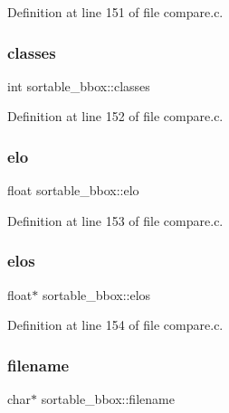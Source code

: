 Definition at line 151 of file compare.\+c.

\mbox{\label{structsortable__bbox_ae063121410175a24bbb9ae8fe901c750}} 
\subsubsection{\texorpdfstring{classes}{classes}}
{\footnotesize\ttfamily int sortable\+\_\+bbox\+::classes}



Definition at line 152 of file compare.\+c.

\mbox{\label{structsortable__bbox_a1e117d8029d714fce1491365316432f5}} 
\subsubsection{\texorpdfstring{elo}{elo}}
{\footnotesize\ttfamily float sortable\+\_\+bbox\+::elo}



Definition at line 153 of file compare.\+c.

\mbox{\label{structsortable__bbox_ab168cd8c3a7c1570cf7da7f7e30ab19c}} 
\subsubsection{\texorpdfstring{elos}{elos}}
{\footnotesize\ttfamily float$\ast$ sortable\+\_\+bbox\+::elos}



Definition at line 154 of file compare.\+c.

\mbox{\label{structsortable__bbox_a2a693ab1fef8df90e937a1ad1c8c0442}} 
\subsubsection{\texorpdfstring{filename}{filename}}
{\footnotesize\ttfamily char$\ast$ sortable\+\_\+bbox\+::filename}



